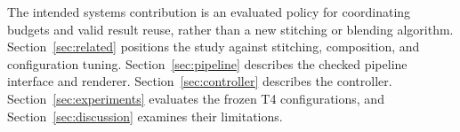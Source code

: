 The intended systems contribution is an evaluated policy for coordinating
budgets and valid result reuse, rather than a new stitching or blending algorithm.
Section~\ref{sec:related} positions the study against stitching, composition,
and configuration tuning. Section~\ref{sec:pipeline} describes the checked pipeline
interface and renderer. Section~\ref{sec:controller} describes the controller.
Section~\ref{sec:experiments} evaluates the frozen T4 configurations, and
Section~\ref{sec:discussion} examines their limitations.
